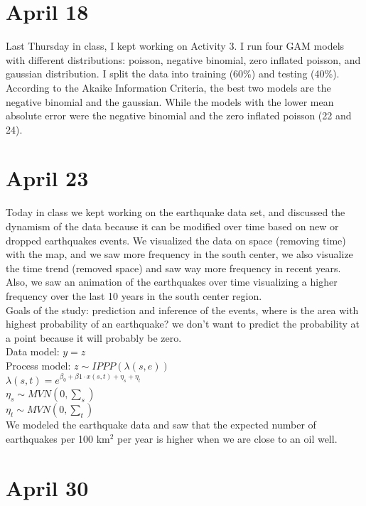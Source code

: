 \documentclass[
]{book}
\begin{document}
\hypertarget{april-18}{%
\section{April 18}\label{april-18}}

Last Thursday in class, I kept working on Activity 3. I run four GAM models with different distributions: poisson, negative binomial, zero inflated poisson, and gaussian distribution. I split the data into training (60\%) and testing (40\%). According to the Akaike Information Criteria, the best two models are the negative binomial and the gaussian. While the models with the lower mean absolute error were the negative binomial and the zero inflated poisson (22 and 24).

\hypertarget{april-23}{%
\section{April 23}\label{april-23}}

Today in class we kept working on the earthquake data set, and discussed the dynamism of the data because it can be modified over time based on new or dropped earthquakes events. We visualized the data on space (removing time) with the map, and we saw more frequency in the south center, we also visualize the time trend (removed space) and saw way more frequency in recent years. Also, we saw an animation of the earthquakes over time visualizing a higher frequency over the last 10 years in the south center region.\\

Goals of the study: prediction and inference of the events, where is the area with highest probability of an earthquake? we don't want to predict the probability at a point because it will probably be zero.\\
Data model: \(y=z\)\\
Process model: \(z \sim IPPP(\lambda(s,e))\)\\
\(\lambda(s,t)=e^{\beta_0+\beta1 \cdot x(s,t)+\eta_s+\eta_t}\)\\
\(\eta_s \sim MVN(0,\sum_s)\)\\
\(\eta_t \sim MVN(0,\sum_t)\)\\

We modeled the earthquake data and saw that the expected number of earthquakes per 100 km\(^2\) per year is higher when we are close to an oil well.

\hypertarget{april-30}{%
\section{April 30}\label{april-30}}
\end{document}

